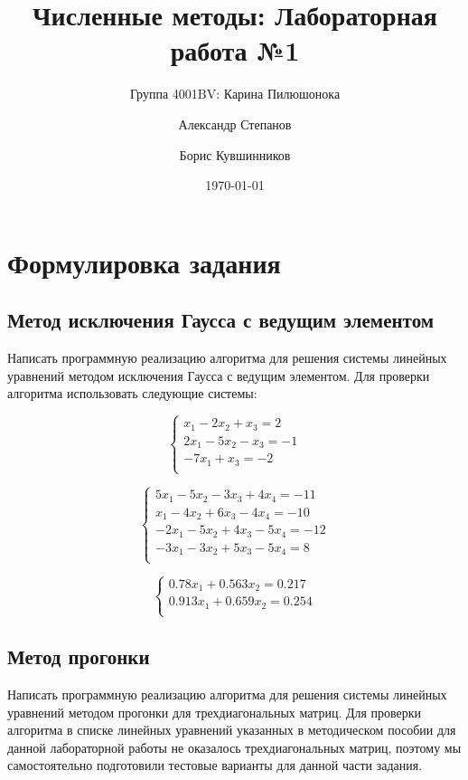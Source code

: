 \documentclass{article}
\title{Численные методы: Лабораторная работа №1}
\author{Группа 4001BV: Карина Пилюшонока \and Александр Степанов \and Борис
Кувшинников}
\date \today
\begin{document}
\maketitle
\newpage
\tableofcontents
\newpage
\section{Формулировка задания}

\subsection{Метод исключения Гаусса с ведущим элементом}
Написать программную реализацию алгоритма для решения системы линейных
уравнений методом исключения Гаусса с ведущим элементом.
Для проверки алгоритма использовать следующие системы:

\begin{equation}\label{1st}
\left\{ \begin{array}{ll}
  x_{1} - 2x_{2} + x_{3} = 2\\
  2x_{1} - 5x_{2} - x_{3} = -1\\
  -7x_{1} + x_{3} = -2\\
\end{array} \right.
\end{equation}

\begin{equation}\label{2st}
\left\{ \begin{array}{ll}
  5x_{1} - 5x_{2} - 3x_{3} + 4x_{4} = -11\\
  x_{1} - 4x_{2} + 6x_{3} - 4x_{4} = -10\\
  -2x_{1} - 5x_{2} + 4x_{3} - 5x_{4} = -12\\
  -3x_{1} - 3x_{2} + 5x_{3} - 5x_{4} = 8\\
\end{array} \right.
\end{equation}

\begin{equation}\label{3d}
\left\{ \begin{array}{ll}
  0.78x_{1} + 0.563x_{2} = 0.217\\
  0.913x_{1} + 0.659x_{2} = 0.254\\
\end{array} \right.
\end{equation}

\subsection{Метод прогонки}
Написать программную реализацию алгоритма для решения системы линейных
уравнений методом прогонки для трехдиагональных матриц.
Для проверки алгоритма в списке линейных уравнений указанных в методическом
пособии для данной лабораторной работы не оказалось трехдиагональных матриц,
поэтому мы самостоятельно подготовили тестовые варианты для данной
части задания.
\end{document}
